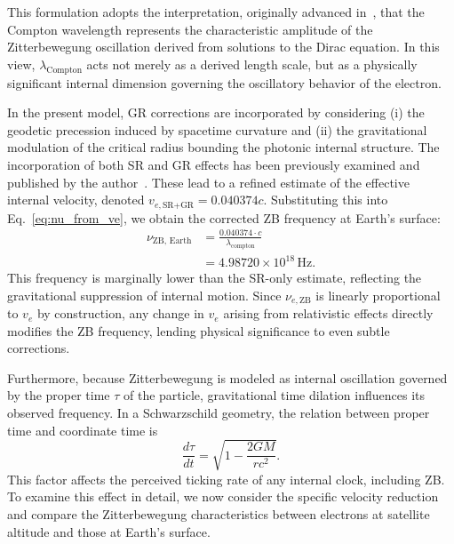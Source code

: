 \documentclass[%
 reprint,
 amsmath,amssymb,
 aps,
]{revtex4-1}
\numberwithin{equation}{section}%
\begin{document}
This formulation adopts the interpretation, originally advanced in~\cite{hanamura1811.0312}, that the Compton wavelength represents the characteristic amplitude of the Zitterbewegung oscillation derived from solutions to the Dirac equation. In this view, $\lambda_{\text{Compton}}$ acts not merely as a derived length scale, but as a physically significant internal dimension governing the oscillatory behavior of the electron.

In the present model, GR corrections are incorporated by considering (i) the geodetic precession induced by spacetime curvature and (ii) the gravitational modulation of the critical radius bounding the photonic internal structure. The incorporation of both SR and GR effects has been previously examined and published by the author~\cite{hanamura2501.0130}. These lead to a refined estimate of the effective internal velocity, denoted $v_{e,\text{SR+GR}} = 0.040374c$. Substituting this into Eq.~\ref{eq:nu_from_ve}, we obtain the corrected ZB frequency at Earth's surface:
\begin{equation}
\begin{aligned}
\nu_{\text{ZB, Earth}} &= \frac{0.040374 \cdot c}{\lambda_{\mathrm{compton}}} \\
&= 4.98720 \times 10^{18} \, \text{Hz}.
\end{aligned}
\end{equation}
This frequency is marginally lower than the SR-only estimate, reflecting the gravitational suppression of internal motion. Since $\nu_{e,\text{ZB}}$ is linearly proportional to $v_e$ by construction, any change in $v_e$ arising from relativistic effects directly modifies the ZB frequency, lending physical significance to even subtle corrections.

Furthermore, because Zitterbewegung is modeled as internal oscillation governed by the proper time $\tau$ of the particle, gravitational time dilation influences its observed frequency. In a Schwarzschild geometry, the relation between proper time and coordinate time is
\begin{equation}
\frac{d\tau}{dt} = \sqrt{1 - \frac{2GM}{rc^2}}.
\end{equation}
This factor affects the perceived ticking rate of any internal clock, including ZB. To examine this effect in detail, we now consider the specific velocity reduction and compare the Zitterbewegung characteristics between electrons at satellite altitude and those at Earth's surface.
\end{document}
